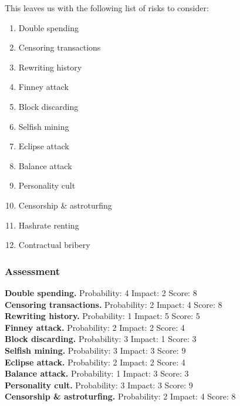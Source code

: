 \documentclass[12pt,a4paper]{article}
\begin{document}
This leaves us with the following list of risks to consider:
\begin{enumerate}
  \item Double spending
  \item Censoring transactions
  \item Rewriting history
  \item Finney attack
  \item Block discarding
  \item Selfish mining
  \item Eclipse attack
  \item Balance attack
  \item Personality cult
  \item Censorship \& astroturfing
  \item Hashrate renting
  \item Contractual bribery
\end{enumerate}

\subsubsection{Assessment}

\textbf{Double spending.}
Probability: 4
Impact: 2
Score: 8\\

\textbf{Censoring transactions.}
Probability: 2
Impact: 4
Score: 8\\

\textbf{Rewriting history.}
Probability: 1
Impact: 5
Score: 5\\

\textbf{Finney attack.}
Probability: 2
Impact: 2
Score: 4\\

\textbf{Block discarding.}
Probability: 3
Impact: 1
Score: 3\\

\textbf{Selfish mining.}
Probability: 3
Impact: 3
Score: 9\\

\textbf{Eclipse attack.}
Probability: 2
Impact: 2
Score: 4\\

\textbf{Balance attack.}
Probability: 1
Impact: 3
Score: 3\\

\textbf{Personality cult.}
Probability: 3
Impact: 3
Score: 9\\

\textbf{Censorship \& astroturfing.}
Probability: 2
Impact: 4
Score: 8\\
\end{document}
